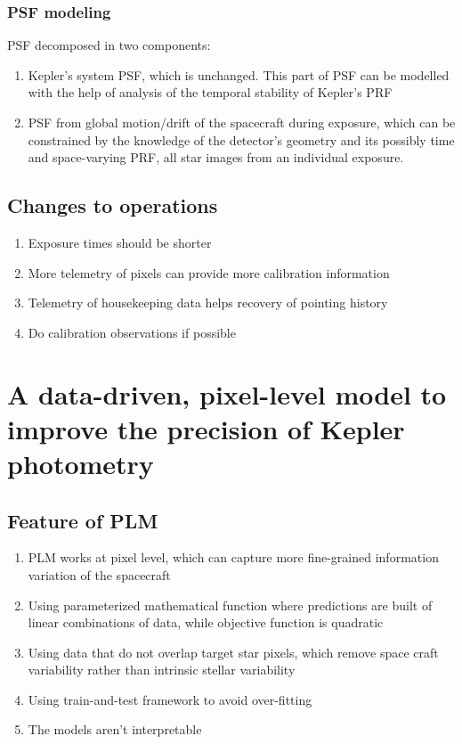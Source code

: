 \documentclass[]{article}
\begin{document}
\subsubsection{PSF modeling}
PSF decomposed in two components:
\begin{enumerate}
 \item Kepler's system PSF, which is unchanged. This part of PSF can be modelled with the help of  analysis of the temporal stability of Kepler's PRF 
 \item PSF from global motion/drift of the spacecraft during exposure, which can be constrained by the knowledge of the detector's geometry and its possibly time and space-varying PRF, all star images from an individual exposure.
\end{enumerate}

\subsection{Changes to operations}
\begin{enumerate}
 \item Exposure times should be shorter
 \item More telemetry of pixels can provide more calibration information
 \item Telemetry of housekeeping data helps recovery of pointing history
 \item Do calibration observations if possible
\end{enumerate}



\section{A data-driven, pixel-level model to improve the precision of Kepler photometry}
\subsection{Feature of PLM} 
\begin{enumerate}
  \item PLM works at pixel level, which can capture more fine-grained information variation of the spacecraft
  \item Using parameterized mathematical function where predictions are built of linear combinations of data, while objective function is quadratic 
  \item Using data that do not overlap target star pixels, which remove space craft variability rather than intrinsic stellar variability
  \item Using train-and-test framework to avoid over-fitting
  \item The models aren't interpretable
\end{enumerate}
\end{document}

